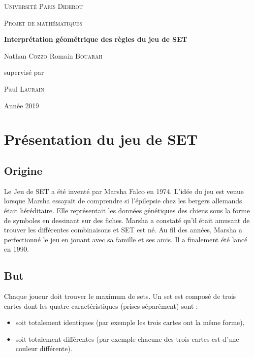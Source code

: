 \documentclass[a4paper,12pt,titlepage]{article}
\theoremstyle{plain}
\theoremstyle{definition}
\begin{document}
\begin{titlepage}
	\centering
	
	{\Large\scshape Université Paris Diderot \par}
	\vspace{2cm}	
	
	{\LARGE\scshape Projet de mathématiques\par}
	\vspace{0.5cm}
	
	{\Huge\bfseries Interprétation géométrique des règles du jeu de SET\par}
	\vspace{1.5cm}
	
	{\Large Nathan \textsc{Cozzo} Romain \textsc{Bouarah}\par}

	\vfill
	{supervisé par\par
	Paul \textsc{Laurain}}

	\vfill

	{\large Année 2019}
\end{titlepage}


\tableofcontents
\newpage


\begin{abstract}
	Dans ce sujet, on verra comment interpréter les règles du jeu de SET de manière géométrique, 
	puis grâce à cette interprétation comment déterminer le nombre de cartes minimal à disposer devant soi pour 	pouvoir toujours trouver un triplet de cartes.
\end{abstract}


\section{Présentation du jeu de SET}
\subsection{Origine}
Le Jeu de SET a été inventé par Marsha Falco en 1974. L'idée du jeu est venue lorsque Marsha essayait de comprendre si l'épilepsie chez les bergers allemands était héréditaire. 
Elle représentait les données génétiques des chiens sous la forme de symboles en dessinant sur des fiches. 
Marsha a constaté qu'il était amusant de trouver les différentes combinaisons et SET est né. Au fil des années, Marsha a perfectionné le jeu en jouant avec sa famille et ses amis. 
Il a finalement été lancé en 1990.

\subsection{But}
Chaque joueur doit trouver le maximum de sets. Un set est composé de trois cartes dont les quatre caractéristiques (prises séparément) sont : 
\begin{itemize}
\item soit totalement identiques (par exemple les trois cartes ont la même forme),
\item soit totalement différentes (par exemple chacune des trois cartes est d'une couleur différente).
\end{itemize}
\end{document}
